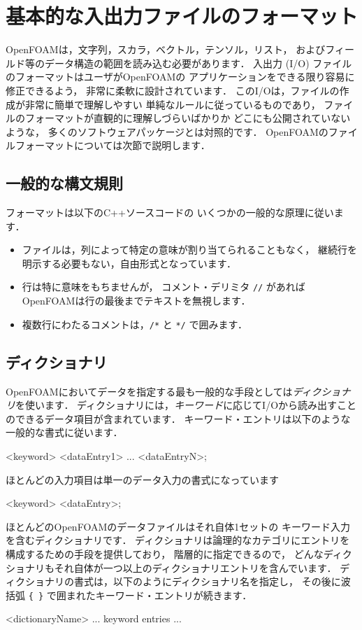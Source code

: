 \section{基本的な入出力ファイルのフォーマット}
\label{sec:4.2}
%
%
OpenFOAMは，文字列，スカラ，ベクトル，テンソル，リスト，
およびフィールド等のデータ構造の範囲を読み込む必要があります．
入出力 (I/O) ファイルのフォーマットはユーザがOpenFOAMの
アプリケーションをできる限り容易に修正できるよう，
非常に柔軟に設計されています．
このI/Oは，ファイルの作成が非常に簡単で理解しやすい
単純なルールに従っているものであり，
ファイルのフォーマットが直観的に理解しづらいばかりか
どこにも公開されていないような，
多くのソフトウェアパッケージとは対照的です．
OpenFOAMのファイルフォーマットについては次節で説明します．


\subsection{一般的な構文規則}
\label{ssec:4.2.1}
フォーマットは以下のC++ソースコードの
いくつかの一般的な原理に従います．
\begin{itemize}
 \item ファイルは，列によって特定の意味が割り当てられることもなく，
       継続行を明示する必要もない，自由形式となっています．
 \item 行は特に意味をもちませんが，
%
%
       コメント・デリミタ \verb|//| があればOpenFOAMは行の最後までテキストを無視します．
 \item 複数行にわたるコメントは，\verb|/*| と \verb|*/| で囲みます．
\end{itemize}


\subsection{ディクショナリ}
\label{ssec:4.2.2}
OpenFOAMにおいてデータを指定する最も一般的な手段としては\emph{ディクショナリ}を使います．
ディクショナリには，\emph{キーワード}に応じてI/Oから読み出すことのできるデータ項目が含まれています．
キーワード・エントリは以下のような一般的な書式に従います．
\begin{OFverbatim}[file]
<keyword>  <dataEntry1> ... <dataEntryN>;
\end{OFverbatim}
ほとんどの入力項目は単一のデータ入力の書式になっています
\begin{OFverbatim}[file]
<keyword>  <dataEntry>;
\end{OFverbatim}
ほとんどのOpenFOAMのデータファイルはそれ自体1セットの
キーワード入力を含むディクショナリです．
ディクショナリは論理的なカテゴリにエントリを構成するための手段を提供しており，
階層的に指定できるので，
どんなディクショナリもそれ自体が一つ以上のディクショナリエントリを含んでいます．
ディクショナリの書式は，以下のようにディクショナリ名を指定し，
その後に波括弧 \verb|{ }| で囲まれたキーワード・エントリが続きます．
\begin{OFverbatim}[file]
<dictionaryName>
{
    ... keyword entries ...
}
\end{OFverbatim}



